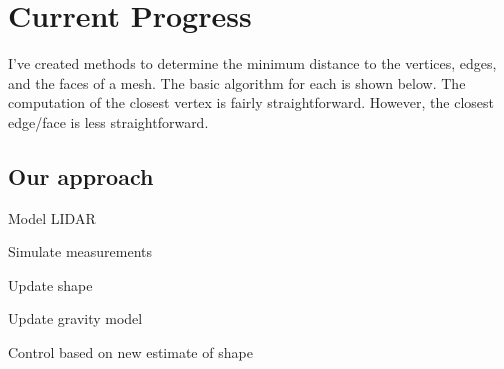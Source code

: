 \section{Current Progress}

I've created methods to determine the minimum distance to the vertices, edges, and the faces of a mesh. 
The basic algorithm for each is shown below.
The computation of the closest vertex is fairly straightforward. 
However, the closest edge/face is less straightforward.


\subsection{Our approach}

Model LIDAR

Simulate measurements

Update shape

Update gravity model

Control based on new estimate of shape
